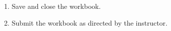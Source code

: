 \begin{enumbox}
\begin{enumerate}
		\item Save and close the  workbook.
		\item Submit the  workbook as directed by the instructor.
	\end{enumerate}
\end{enumbox}
